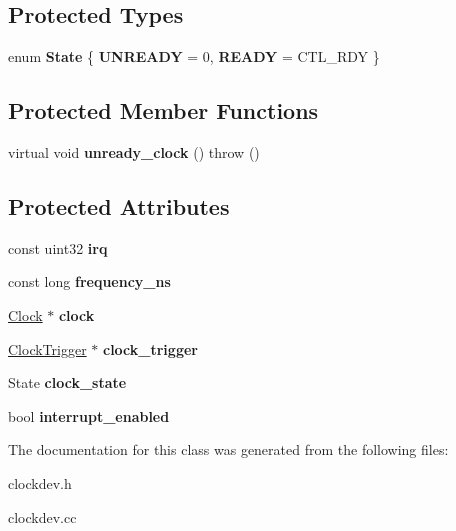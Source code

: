 \subsection*{Protected Types}
\begin{DoxyCompactItemize}
\item 
enum {\bfseries State} \{ {\bfseries UNREADY} =  0, 
{\bfseries READY} =  CTL\_\-RDY
 \}
\end{DoxyCompactItemize}
\subsection*{Protected Member Functions}
\begin{DoxyCompactItemize}
\item 
\hypertarget{classClockDevice_aad402cce484ce8c1fc8730029022a730}{
virtual void {\bfseries unready\_\-clock} ()  throw ()}
\label{classClockDevice_aad402cce484ce8c1fc8730029022a730}

\end{DoxyCompactItemize}
\subsection*{Protected Attributes}
\begin{DoxyCompactItemize}
\item 
\hypertarget{classClockDevice_a43d305efaa3b4ce21fec56209b77b936}{
const uint32 {\bfseries irq}}
\label{classClockDevice_a43d305efaa3b4ce21fec56209b77b936}

\item 
\hypertarget{classClockDevice_a0b398fdd22019bbac72426bcd035731b}{
const long {\bfseries frequency\_\-ns}}
\label{classClockDevice_a0b398fdd22019bbac72426bcd035731b}

\item 
\hypertarget{classClockDevice_a7d249ac5fcd2bab6dced445926363eaf}{
\hyperlink{classClock}{Clock} $\ast$ {\bfseries clock}}
\label{classClockDevice_a7d249ac5fcd2bab6dced445926363eaf}

\item 
\hypertarget{classClockDevice_a59429aef5d33a07cd1bf72ecb743c956}{
\hyperlink{classClockDevice_1_1ClockTrigger}{ClockTrigger} $\ast$ {\bfseries clock\_\-trigger}}
\label{classClockDevice_a59429aef5d33a07cd1bf72ecb743c956}

\item 
\hypertarget{classClockDevice_ac166cba15b49be2b29f3d6d7cd7da087}{
State {\bfseries clock\_\-state}}
\label{classClockDevice_ac166cba15b49be2b29f3d6d7cd7da087}

\item 
\hypertarget{classClockDevice_aee58d6b7d301a0791a511002d2ead157}{
bool {\bfseries interrupt\_\-enabled}}
\label{classClockDevice_aee58d6b7d301a0791a511002d2ead157}

\end{DoxyCompactItemize}


The documentation for this class was generated from the following files:\begin{DoxyCompactItemize}
\item 
clockdev.h\item 
clockdev.cc\end{DoxyCompactItemize}
